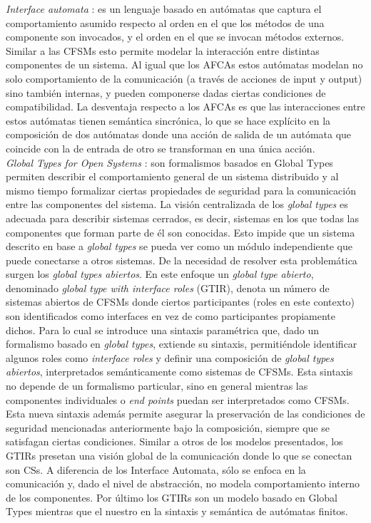 \emph{Interface automata} \cite{dealfaro:esec-fse-01}: es un lenguaje basado en autómatas que captura el comportamiento asumido respecto al orden en el que los métodos de una componente son invocados, y el orden en el que se invocan métodos externos. Similar a las CFSMs esto permite modelar la interacción entre distintas componentes de un sistema. Al igual que los AFCAs estos autómatas modelan no solo comportamiento de la comunicación (a través de acciones de input y output) sino también internas, y pueden componerse dadas ciertas condiciones de compatibilidad. La desventaja respecto a los AFCAs es que las interacciones entre estos autómatas tienen semántica sincrónica, lo que se hace explícito en la composición de dos autómatas donde una acción de salida de un autómata que coincide con la de entrada de otro se transforman en una única acción.\\

\emph{Global Types for Open Systems} \cite{barbanera:eptcs279}: son formalismos basados en Global Types permiten describir el comportamiento general de un sistema distribuido y al mismo tiempo formalizar ciertas propiedades de seguridad para la comunicación entre las componentes del sistema. La visión centralizada de los \emph{global types} es adecuada para describir sistemas cerrados, es decir, sistemas en los que todas las componentes que forman parte de él son conocidas. Esto impide que un sistema descrito en base a \emph{global types} se pueda ver como un módulo independiente que puede conectarse a otros sistemas. De la necesidad de resolver esta problemática surgen los \emph{global types abiertos}. En este enfoque un \emph{global type abierto}, denominado \emph{global type with interface roles} (GTIR), denota un número de sistemas abiertos de CFSMs donde ciertos participantes (roles en este contexto) son identificados como interfaces en vez de como participantes propiamente dichos. Para lo cual se introduce una sintaxis paramétrica que, dado un formalismo basado en \emph{global types}, extiende su sintaxis, permitiéndole identificar algunos roles como \emph{interface roles} y definir una composición de \emph{global types abiertos}, interpretados semánticamente como sistemas de CFSMs. Esta sintaxis no depende de un formalismo particular, sino en general mientras las componentes individuales o \emph{end points} puedan ser interpretados como CFSMs. Esta nueva sintaxis además permite asegurar la preservación de las condiciones de seguridad mencionadas anteriormente bajo la composición, siempre que se satisfagan ciertas condiciones. Similar a otros de los modelos presentados, los GTIRs presetan una visión global de la comunicación donde lo que se conectan son CSs. A diferencia de los Interface Automata, sólo se enfoca en la comunicación y, dado el nivel de abstracción, no modela comportamiento interno de los componentes. Por último los GTIRs son un modelo basado en Global Types mientras que el nuestro en la sintaxis y semántica de autómatas finitos. \\

